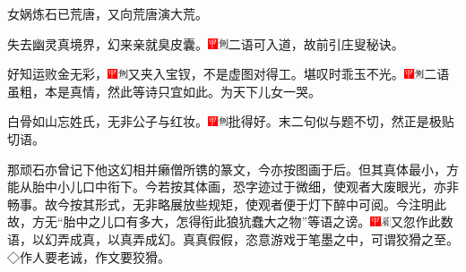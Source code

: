 女娲炼石已荒唐，又向荒唐演大荒。

失去幽灵真境界，幻来亲就臭皮囊。{\includegraphics[width=3mm]{../Images/00002}\includegraphics[width=3mm]{../Images/00011}\footnotesize \kaishu 二语可入道，故前引庄叟秘诀。}

好知运败金无彩，{\includegraphics[width=3mm]{../Images/00002}\includegraphics[width=3mm]{../Images/00011}\footnotesize \kaishu 又夹入宝钗，不是虚图对得工。}堪叹时乖玉不光。{\includegraphics[width=3mm]{../Images/00002}\includegraphics[width=3mm]{../Images/00011}\footnotesize \kaishu 二语虽粗，本是真情，然此等诗只宜如此。为天下儿女一哭。}

白骨如山忘姓氏，无非公子与红妆。{\includegraphics[width=3mm]{../Images/00002}\includegraphics[width=3mm]{../Images/00011}\footnotesize \kaishu 批得好。末二句似与题不切，然正是极贴切语。}

那顽石亦曾记下他这幻相并癞僧所镌的篆文，今亦按图画于后。但其真体最小，方能从胎中小儿口中衔下。今若按其体画，恐字迹过于微细，使观者大废眼光，亦非畅事。故今按其形式，无非略展放些规矩，使观者便于灯下醉中可阅。今注明此故，方无``胎中之儿口有多大，怎得衔此狼犺蠢大之物''等语之谤。{\includegraphics[width=3mm]{../Images/00002}\includegraphics[width=3mm]{../Images/00010}\footnotesize \kaishu 又忽作此数语，以幻弄成真，以真弄成幻。真真假假，恣意游戏于笔墨之中，可谓狡猾之至。◇作人要老诚，作文要狡猾。}


